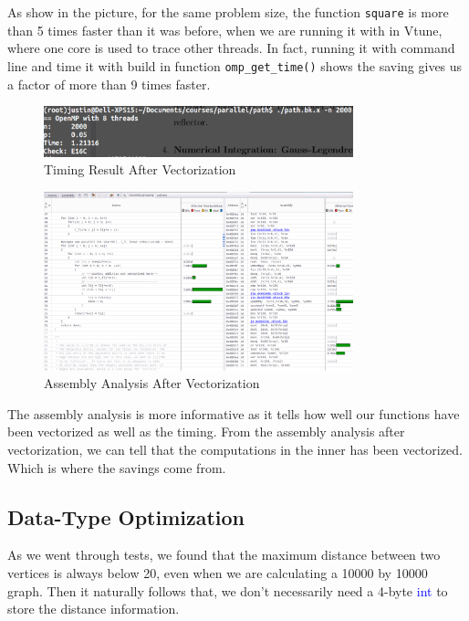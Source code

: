 As show in the picture, for the same problem size, the function \texttt{square} is more than 5
times faster than it was before, when we are running it with in Vtune, where one core is used to
trace other threads. In fact, running it with command line and time it with build in function
\texttt{omp\_get\_time()} shows the saving gives us a factor of more than 9 times faster.

\begin{figure}[H]
    \centering
    \includegraphics[width=0.8\textwidth]{figs/1_timing.png}
    \caption{Timing Result After Vectorization}
    \label{vectorized_profile_result_1}
\end{figure}

\begin{figure}[H]
    \centering
    \includegraphics[width=0.8\textwidth]{figs/1_assembly.png}
    \caption{Assembly Analysis After Vectorization}
    \label{vectorized_profile_result_2}
\end{figure}

The assembly analysis is more informative as it tells how well our functions have been vectorized
as well as the timing. From the assembly analysis after vectorization, we can tell that the computations
in the inner has been vectorized. Which is where the savings come from.



\subsection{Data-Type Optimization}
As we went through tests, we found that the maximum distance between two vertices is
always below 20, even when we are calculating a 10000 by 10000 graph. Then it naturally
follows that, we don't necessarily need a 4-byte \textcolor{blue}{int} to store the
distance information. \\

